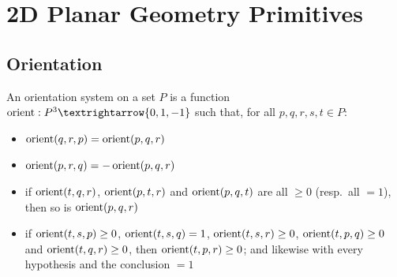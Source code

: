 \chapter{2D Planar Geometry Primitives}
\label{chap:primitives}

\section{Orientation}


\begin{definition}
  \label{def:orientationSystem}
  \leanok
  An orientation system on a set $P$ is a function
  $\orient : P^3 → \{0, 1, -1\}$ such that, for all $p, q, r, s, t ∈ P$:
  \begin{itemize}
    \item $\operatorname{orient}(q, r, p) = \operatorname{orient}(p, q, r)$
    \item $\operatorname{orient}(p, r, q) = -\operatorname{orient}(p, q, r)$
    \item if $\operatorname{orient}(t, q, r)$, $\operatorname{orient}(p, t, r)$ and $\operatorname{orient}(p, q, t)$ are
      all $\geq 0$ (resp.\ all $= 1$), then so is $\operatorname{orient}(p, q, r)$
    \item if $\operatorname{orient}(t, s, p) \geq 0$, $\operatorname{orient}(t, s, q) = 1$,
      $\operatorname{orient}(t, s, r) \geq 0$, $\operatorname{orient}(t, p, q) \geq 0$ and
      $\operatorname{orient}(t, q, r) \geq 0$, then $\operatorname{orient}(t, p, r) \geq 0$; and likewise
      with every hypothesis and the conclusion $= 1$
  \end{itemize}
\end{definition}

